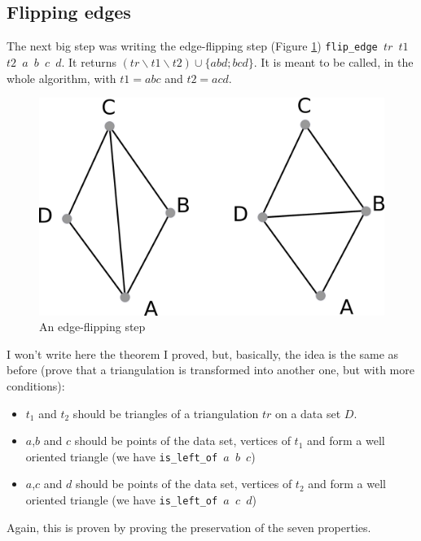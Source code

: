\documentclass[a4paper,10pt]{article}
\begin{document}
  
\subsection{Flipping edges}
The next big step was writing the edge-flipping step (Figure \ref{flip_edge}) {\tt flip\_edge $tr$ $t1$ $t2$ $a$ $b$ $c$ $d$}.
It returns $(tr \smallsetminus t1 \smallsetminus t2) \cup \{abd;bcd\}$. It is meant to be called, in the whole algorithm, with $t1 = abc$ and $t2=acd$.

\begin{figure}
  \centering
  \includegraphics[scale=2]{flip_edge}
    \caption{\label{flip_edge} An edge-flipping step}
\end{figure}

I won't write here the theorem I proved, but, basically, the idea is the same as before (prove that a triangulation is transformed into another one, but with more conditions):
\begin{itemize}
\item $t_1$ and $t_2$ should be triangles of a triangulation $tr$ on a data set $D$.  
\item $a$,$b$ and $c$ should be points of the data set, vertices of $t_1$ and form a well oriented triangle (we have {\tt is\_left\_of $a$ $b$ $c$})
\item $a$,$c$ and $d$ should be points of the data set, vertices of $t_2$ and form a well oriented triangle (we have {\tt is\_left\_of $a$ $c$ $d$})
\end{itemize}
Again, this is proven by proving the preservation of the seven properties.
\end{document}
